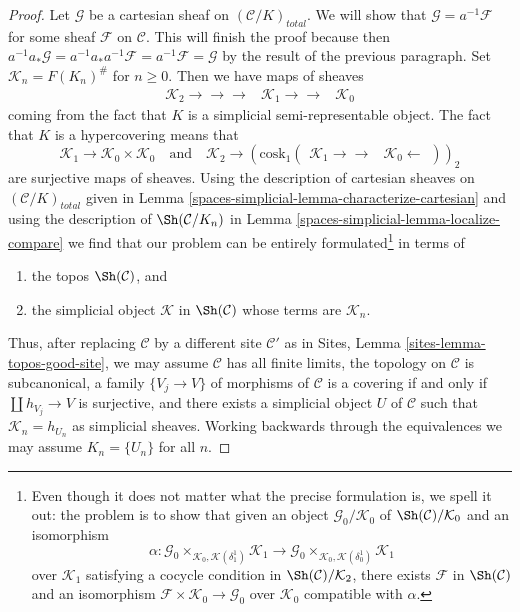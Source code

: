 \begin{proof}
\medskip\noindent
Let $\mathcal{G}$ be a cartesian sheaf on $(\mathcal{C}/K)_{total}$.
We will show that $\mathcal{G} = a^{-1}\mathcal{F}$ for some sheaf
$\mathcal{F}$ on $\mathcal{C}$. This will finish the proof because
then $a^{-1}a_*\mathcal{G} = a^{-1}a_*a^{-1}\mathcal{F} =
a^{-1}\mathcal{F} = \mathcal{G}$ by the result of the previous paragraph.
Set $\mathcal{K}_n = F(K_n)^\#$ for $n \geq 0$. Then we have maps of sheaves
$$
\begin{array}{ccc}\mathcal{K}_2
\longrightarrow\longrightarrow\longrightarrow & \mathcal{K}_1
\longrightarrow\longrightarrow & \mathcal{K}_0\end{array}
$$
coming from the fact that $K$ is a simplicial semi-representable object.
The fact that $K$ is a hypercovering means that
$$
\mathcal{K}_1 \to \mathcal{K}_0 \times \mathcal{K}_0
\quad\text{and}\quad
\mathcal{K}_2 \to
\left(\text{cosk}_1(
\begin{array}{cc}\mathcal{K}_1
\longrightarrow\longrightarrow & \mathcal{K}_0 \longleftarrow\end{array})\right)_2
$$
are surjective maps of sheaves. Using the description of cartesian sheaves on
$(\mathcal{C}/K)_{total}$ given in Lemma \ref{spaces-simplicial-lemma-characterize-cartesian}
and using the description of $\Sh(\mathcal{C}/K_n)$ in
Lemma \ref{spaces-simplicial-lemma-localize-compare}
we find that our problem can be entirely formulated\footnote{Even though it
does not matter what the precise formulation is, we spell it out:
the problem is to show that given an object
$\mathcal{G}_0/\mathcal{K}_0$ of $\Sh(\mathcal{C})/\mathcal{K}_0$
and an isomorphism
$$
\alpha :
\mathcal{G}_0 \times_{\mathcal{K}_0, \mathcal{K}(\delta^1_1)} \mathcal{K}_1 \to
\mathcal{G}_0 \times_{\mathcal{K}_0, \mathcal{K}(\delta^1_0)} \mathcal{K}_1
$$
over $\mathcal{K}_1$ satisfying a cocycle condition in
$\Sh(\mathcal{C})/\mathcal{K}_2$, there exists
$\mathcal{F}$ in $\Sh(\mathcal{C})$ and an isomorphism
$\mathcal{F} \times \mathcal{K}_0 \to \mathcal{G}_0$ over $\mathcal{K}_0$
compatible with $\alpha$.} in terms of
\begin{enumerate}
\item the topos $\Sh(\mathcal{C})$, and
\item the simplicial object $\mathcal{K}$ in $\Sh(\mathcal{C})$
whose terms are $\mathcal{K}_n$.
\end{enumerate}
Thus, after replacing $\mathcal{C}$ by a different site $\mathcal{C}'$
as in Sites, Lemma \ref{sites-lemma-topos-good-site}, we may assume
$\mathcal{C}$ has all finite limits,
the topology on $\mathcal{C}$ is subcanonical,
a family $\{V_j \to V\}$ of morphisms of $\mathcal{C}$
is a covering if and only if $\coprod h_{V_j} \to V$ is surjective, and
there exists a simplicial object $U$ of $\mathcal{C}$
such that $\mathcal{K}_n = h_{U_n}$ as simplicial sheaves.
Working backwards through the equivalences we may assume
$K_n = \{U_n\}$ for all $n$.


\end{proof}
